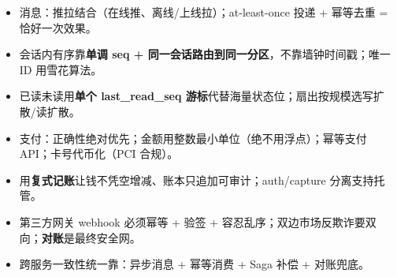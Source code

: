 \begin{keypoint}[本章速记]
\begin{itemize}
  \item 消息：推拉结合（在线推、离线/上线拉）；at-least-once 投递 + 幂等去重 = 恰好一次效果。
  \item 会话内有序靠\textbf{单调 seq + 同一会话路由到同一分区}，不靠墙钟时间戳；唯一 ID 用雪花算法。
  \item 已读未读用\textbf{单个 last\_read\_seq 游标}代替海量状态位；扇出按规模选写扩散/读扩散。
  \item 支付：正确性绝对优先；金额用整数最小单位（绝不用浮点）；幂等支付 API；卡号代币化（PCI 合规）。
  \item 用\textbf{复式记账}让钱不凭空增减、账本只追加可审计；auth/capture 分离支持托管。
  \item 第三方网关 webhook 必须幂等 + 验签 + 容忍乱序；双边市场反欺诈要双向；\textbf{对账}是最终安全网。
  \item 跨服务一致性统一靠：异步消息 + 幂等消费 + Saga 补偿 + 对账兜底。
\end{itemize}
\end{keypoint}
